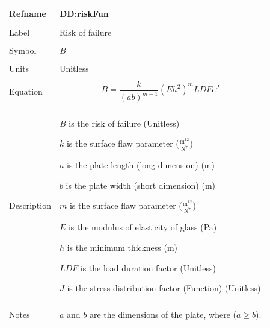 \documentclass[12pt]{article}
\begin{document}
\vspace{\baselineskip}
\noindent
\begin{minipage}{\textwidth}
\begin{tabular}{>{\raggedright}p{}>{\raggedright\arraybackslash}p{}}
\toprule \textbf{Refname} & \textbf{DD:riskFun}
\label{DD:riskFun}
\\ \midrule \\
Label & Risk of failure
        
\\ \midrule \\
Symbol & $B$
         
\\ \midrule \\
Units & Unitless
        
\\ \midrule \\
Equation & \begin{displaymath}
           B=\frac{k}{\left(a b\right)^{m-1}} \left(E h^{2}\right)^{m} LDF e^{J}
           \end{displaymath}
\\ \midrule \\
Description & \begin{symbDescription}
              \item{$B$ is the risk of failure (Unitless)}
              \item{$k$ is the surface flaw parameter ($\frac{\text{m}^{12}}{\text{N}^{7}}$)}
              \item{$a$ is the plate length (long dimension) (m)}
              \item{$b$ is the plate width (short dimension) (m)}
              \item{$m$ is the surface flaw parameter ($\frac{\text{m}^{12}}{\text{N}^{7}}$)}
              \item{$E$ is the modulus of elasticity of glass (Pa)}
              \item{$h$ is the minimum thickness (m)}
              \item{$LDF$ is the load duration factor (Unitless)}
              \item{$J$ is the stress distribution factor (Function) (Unitless)}
              \end{symbDescription}
\\ \midrule \\
Notes & $a$ and $b$ are the dimensions of the plate, where ($a\geq{}b$).
        

\end{tabular}
\end{minipage}
\end{document}

